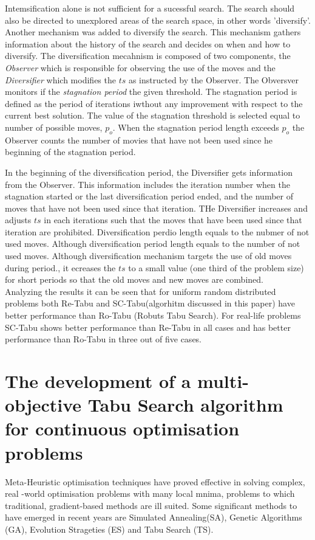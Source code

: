 \documentclass[pdftex,11pt]{article}
\begin{document}
Intemsification alone is not sufficient for a sucessful search. The search should also be directed to unexplored areas of the search space, in other words 'diversify'. Another mechanism was added to diversify the search. This mechanism gathers information about the history of the search and decides on when and how to diversify. The diversification mecahnism is composed of two components, the \emph{Observer} which is responsible for observing the use of the moves and the \emph{Diversifier} which modifies the $ts$ as instructed by the Observer. The Obversver monitors if the \emph{stagnation period} the given threshold. The stagnation period is defined as the period of iterations iwthout any improvement with respect to the current best solution. The value of the stagnation threshold is selected equal to number of possible moves, $p_o$. When the stagnation period length exceeds $p_o$ the Observer counts the number of movies that have not been used since he beginning of the stagnation period.

In the beginning of the diversification period, the Diversifier gets information from the Observer. This information includes the iteration number when the stagnation started or the last diversification period ended, and the number of moves that have not been used since that iteration. THe Diversifier increases and adjusts $ts$ in each iterations such that the moves that have been used since that iteration are prohibited. Diversification perdio length equals to the nubmer of not used moves. Although diversification period length equals to the number of not used moves. Although diversification mechanism targets the use of old moves during period., it ecreases the $ts$ to a small value (one third of the problem size) for short periods so that the old moves and new moves are combined.\\

Analyzing the results it can be seen that for uniform random distributed problems both Re-Tabu and SC-Tabu(algorhitm discussed in this paper) have better performance than Ro-Tabu (Robuts Tabu Search). For real-life problems SC-Tabu shows better performance than Re-Tabu in all cases and has better performance than Ro-Tabu in three out of five cases.

\section*{The development of a multi-objective Tabu Search algorithm for continuous optimisation problems}
Meta-Heuristic optimisation techniques have proved effective in solving complex, real -world optimisation problems with many local mnima, problems to which traditional, gradient-based methods are ill suited. Some significant methods to have emerged in recent years are Simulated Annealing(SA), Genetic Algorithms (GA), Evolution Strageties (ES) and Tabu Search (TS).
\end{document}
